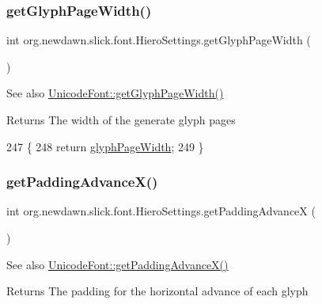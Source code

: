 \subsubsection{\texorpdfstring{get\+Glyph\+Page\+Width()}{getGlyphPageWidth()}}
{\footnotesize\ttfamily int org.\+newdawn.\+slick.\+font.\+Hiero\+Settings.\+get\+Glyph\+Page\+Width (\begin{DoxyParamCaption}{ }\end{DoxyParamCaption})\hspace{0.3cm}{\ttfamily [inline]}}

\begin{DoxySeeAlso}{See also}
\mbox{\hyperlink{classorg_1_1newdawn_1_1slick_1_1_unicode_font_a1a033ce1ceec45ced33842cdf6e25670}{Unicode\+Font\+::get\+Glyph\+Page\+Width()}}
\end{DoxySeeAlso}
\begin{DoxyReturn}{Returns}
The width of the generate glyph pages 
\end{DoxyReturn}

\begin{DoxyCode}
247                                    \{
248         \textcolor{keywordflow}{return} \mbox{\hyperlink{classorg_1_1newdawn_1_1slick_1_1font_1_1_hiero_settings_aeed4e1a4668cfa3c3dc94d481f68a5c3}{glyphPageWidth}};
249     \}
\end{DoxyCode}
\mbox{\label{classorg_1_1newdawn_1_1slick_1_1font_1_1_hiero_settings_ab0b5d7099becb372761cdbcfb85f4fa5}} 
\subsubsection{\texorpdfstring{get\+Padding\+Advance\+X()}{getPaddingAdvanceX()}}
{\footnotesize\ttfamily int org.\+newdawn.\+slick.\+font.\+Hiero\+Settings.\+get\+Padding\+AdvanceX (\begin{DoxyParamCaption}{ }\end{DoxyParamCaption})\hspace{0.3cm}{\ttfamily [inline]}}

\begin{DoxySeeAlso}{See also}
\mbox{\hyperlink{classorg_1_1newdawn_1_1slick_1_1_unicode_font_a51f2a48ec3062648508078779ff36856}{Unicode\+Font\+::get\+Padding\+Advance\+X()}}
\end{DoxySeeAlso}
\begin{DoxyReturn}{Returns}
The padding for the horizontal advance of each glyph 
\end{DoxyReturn}

